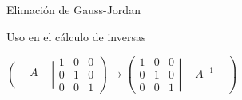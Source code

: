 \documentclass [8pt] {beamer}
\begin{document}
\begin{frame}{Elimación de Gauss-Jordan}
            \begin{block}{Uso en el cálculo de inversas}
                \begin{center}
                    {$\left. \left( \begin{array}{ccc} & & \\ & A & \\ & & \\ 
                    \end{array} \right| \begin{array}{lll}
                    1 & 0 & 0\\
                    0 & 1 & 0\\
                    0 & 0 & 1
                    \end{array} \right) \rightarrow \left( \begin{array}{lll}
                    1 & 0 & 0\\
                    0 & 1 & 0\\
                    0 & 0 & 1
                    \end{array} \left| \begin{array}{ccc} & & \\ & A^{- 1} & \\ & & \\ \end{array} \right. \right)$}
                \end{center}
            \end{block}
        \end{frame}
\end{document}
